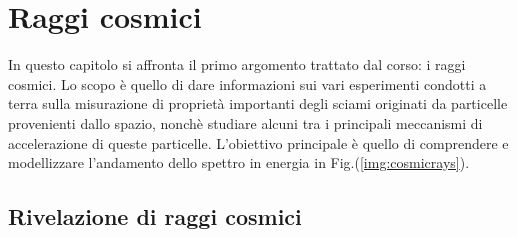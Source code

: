 \chapterspaceabove{6.75cm} %
\chapterspacebelow{7.25cm} %


\chapter{Raggi cosmici}

In questo capitolo si affronta il primo argomento trattato dal corso: i raggi cosmici. Lo scopo è quello di dare informazioni sui vari esperimenti condotti a terra sulla misurazione di proprietà importanti degli sciami originati da particelle provenienti dallo spazio, nonchè studiare alcuni tra i principali meccanismi di accelerazione di queste particelle. L'obiettivo principale è quello di comprendere e modellizzare l'andamento dello spettro in energia in Fig.(\ref{img:cosmicrays}).

\section{Rivelazione di raggi cosmici}

